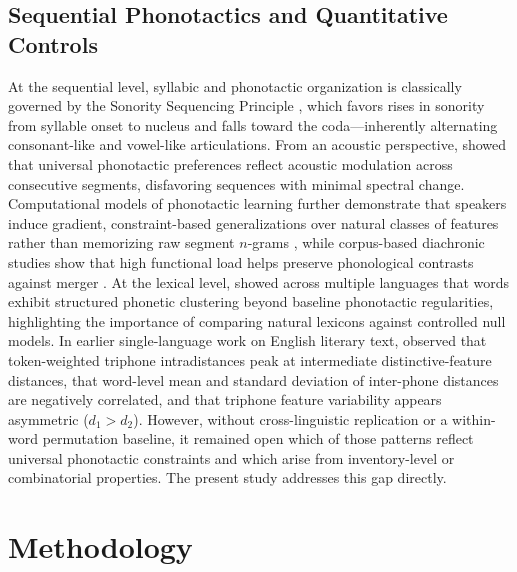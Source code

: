 \documentclass{interact}
\begin{document}
\subsection{Sequential Phonotactics and Quantitative Controls}
At the sequential level, syllabic and phonotactic organization is classically governed by the Sonority Sequencing Principle \citep{clements1990}, which favors rises in sonority from syllable onset to nucleus and falls toward the coda---inherently alternating consonant-like and vowel-like articulations. From an acoustic perspective, \citet{kawasakifukumori1992} showed that universal phonotactic preferences reflect acoustic modulation across consecutive segments, disfavoring sequences with minimal spectral change. Computational models of phonotactic learning further demonstrate that speakers induce gradient, constraint-based generalizations over natural classes of features rather than memorizing raw segment $n$-grams \citep{hayes2008}, while corpus-based diachronic studies show that high functional load helps preserve phonological contrasts against merger \citep{wedel2013}. At the lexical level, \citet{dautriche2017} showed across multiple languages that words exhibit structured phonetic clustering beyond baseline phonotactic regularities, highlighting the importance of comparing natural lexicons against controlled null models. In earlier single-language work on English literary text, \citet{araujo2013thesis} observed that token-weighted triphone intradistances peak at intermediate distinctive-feature distances, that word-level mean and standard deviation of inter-phone distances are negatively correlated, and that triphone feature variability appears asymmetric ($d_1 > d_2$). However, without cross-linguistic replication or a within-word permutation baseline, it remained open which of those patterns reflect universal phonotactic constraints and which arise from inventory-level or combinatorial properties. The present study addresses this gap directly.

\section{Methodology}
\end{document}

